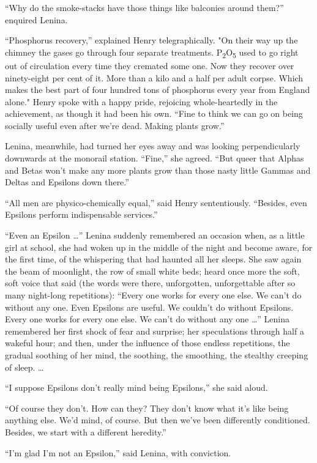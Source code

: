 \documentclass[12pt]{report}
\begin{document}
``Why do the smoke-stacks have those things like balconies around
them?'' enquired Lenina.

``Phosphorus recovery,'' explained Henry telegraphically. "On their way
up the chimney the gases go through four separate treatments.
P\textsubscript{2}O\textsubscript{5} used to go right out of circulation
every time they cremated some one. Now they recover over ninety-eight
per cent of it. More than a kilo and a half per adult corpse. Which
makes the best part of four hundred tons of phosphorus every year from
England alone." Henry spoke with a happy pride, rejoicing
whole-heartedly in the achievement, as though it had been his own.
``Fine to think we can go on being socially useful even after we're
dead. Making plants grow.''

Lenina, meanwhile, had turned her eyes away and was looking
perpendicularly downwards at the monorail station. ``Fine,'' she agreed.
``But queer that Alphas and Betas won't make any more plants grow than
those nasty little Gammas and Deltas and Epsilons down there.''

``All men are physico-chemically equal,'' said Henry sententiously.
``Besides, even Epsilons perform indispensable services.''

``Even an Epsilon \ldots{}'' Lenina suddenly remembered an occasion
when, as a little girl at school, she had woken up in the middle of the
night and become aware, for the first time, of the whispering that had
haunted all her sleeps. She saw again the beam of moonlight, the row of
small white beds; heard once more the soft, soft voice that said (the
words were there, unforgotten, unforgettable after so many night-long
repetitions): ``Every one works for every one else. We can't do without
any one. Even Epsilons are useful. We couldn't do without Epsilons.
Every one works for every one else. We can't do without any one
\ldots{}'' Lenina remembered her first shock of fear and surprise; her
speculations through half a wakeful hour; and then, under the influence
of those endless repetitions, the gradual soothing of her mind, the
soothing, the smoothing, the stealthy creeping of sleep. \ldots{}

``I suppose Epsilons don't really mind being Epsilons,'' she said aloud.

``Of course they don't. How can they? They don't know what it's like
being anything else. We'd mind, of course. But then we've been
differently conditioned. Besides, we start with a different heredity.''

``I'm glad I'm not an Epsilon,'' said Lenina, with conviction.
\end{document}

